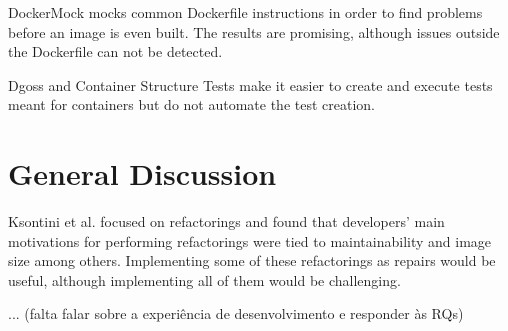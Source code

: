 DockerMock \cite{liDockerMockPreBuildDetection2021} mocks common Dockerfile instructions in order to find problems before an image is even built. The results are promising, although issues outside the Dockerfile can not be detected.

Dgoss and Container Structure Tests make it easier to create and execute tests meant for containers but do not automate the test creation.

\section{General Discussion} \label{sec:general_discussion}

Ksontini et al. \cite{ksontiniRefactoringsTechnicalDebt} focused on refactorings and found that developers' main motivations for performing refactorings were tied to maintainability and image size among others. Implementing some of these refactorings as repairs would be useful, although implementing all of them would be challenging.

... (falta falar sobre a experiência de desenvolvimento e responder às RQs)

